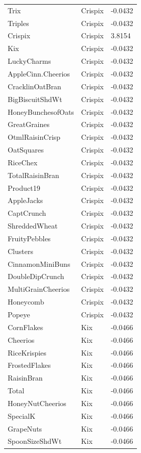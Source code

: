 \begin{table}[!htbp]
\begin{tabular}{lll}
\\
Trix & Crispix & -0.0432
\\
Triples & Crispix & -0.0432
\\
Crispix & Crispix & 3.8154
\\
Kix & Crispix & -0.0432
\\
LuckyCharms & Crispix & -0.0432
\\
AppleCinn.Cheerios & Crispix & -0.0432
\\
CracklinOatBran & Crispix & -0.0432
\\
BigBiscuitShdWt & Crispix & -0.0432
\\
HoneyBunchesofOats & Crispix & -0.0432
\\
GreatGraines & Crispix & -0.0432
\\
OtmlRaisinCrisp & Crispix & -0.0432
\\
OatSquares & Crispix & -0.0432
\\
RiceChex & Crispix & -0.0432
\\
TotalRaisinBran & Crispix & -0.0432
\\
Product19 & Crispix & -0.0432
\\
AppleJacks & Crispix & -0.0432
\\
CaptCrunch & Crispix & -0.0432
\\
ShreddedWheat & Crispix & -0.0432
\\
FruityPebbles & Crispix & -0.0432
\\
Clusters & Crispix & -0.0432
\\
CinnamonMiniBuns & Crispix & -0.0432
\\
DoubleDipCrunch & Crispix & -0.0432
\\
MultiGrainCheerios & Crispix & -0.0432
\\
Honeycomb & Crispix & -0.0432
\\
Popeye & Crispix & -0.0432
\\
CornFlakes & Kix & -0.0466
\\
Cheerios & Kix & -0.0466
\\
RiceKrispies & Kix & -0.0466
\\
FrostedFlakes & Kix & -0.0466
\\
RaisinBran & Kix & -0.0466
\\
Total & Kix & -0.0466
\\
HoneyNutCheerios & Kix & -0.0466
\\
SpecialK & Kix & -0.0466
\\
GrapeNuts & Kix & -0.0466
\\
SpoonSizeShdWt & Kix & -0.0466
\\

\end{tabular}
\end{table}
